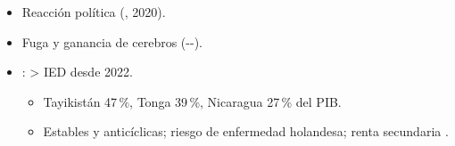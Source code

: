\documentclass{article}
\begin{document}
\begin{columnas}
\begin{itemize}
\begin{itemize}
  \item {}- (2019), control sintético: no; -: composición de la muestra.
  \end{itemize}
\item Reacción política (, 2020).
\end{itemize}
\begin{itemize}
\item Fuga y ganancia de cerebros (--).
\item {} : > IED desde 2022.
  \begin{itemize}
  \item Tayikistán 47\,\%, Tonga 39\,\%, Nicaragua 27\,\% del PIB.
  \item Estables y anticíclicas; riesgo de enfermedad holandesa; renta secundaria .
  \end{itemize}
\end{itemize}


\end{columnas}
\end{document}
